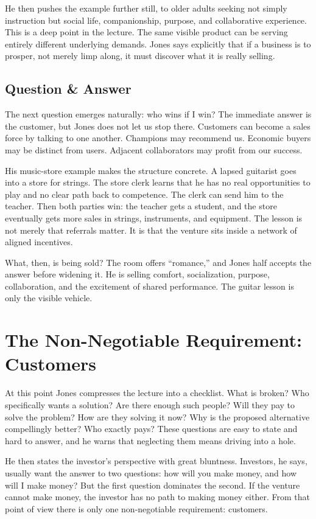 He then pushes the example further still, to older adults seeking not simply instruction but social life, companionship, purpose, and collaborative experience. This is a deep point in the lecture. The same visible product can be serving entirely different underlying demands. Jones says explicitly that if a business is to prosper, not merely limp along, it must discover what it is really selling.

\subsection{Question \& Answer}

The next question emerges naturally: who wins if I win? The immediate answer is the customer, but Jones does not let us stop there. Customers can become a sales force by talking to one another. Champions may recommend us. Economic buyers may be distinct from users. Adjacent collaborators may profit from our success.

His music-store example makes the structure concrete. A lapsed guitarist goes into a store for strings. The store clerk learns that he has no real opportunities to play and no clear path back to competence. The clerk can send him to the teacher. Then both parties win: the teacher gets a student, and the store eventually gets more sales in strings, instruments, and equipment. The lesson is not merely that referrals matter. It is that the venture sits inside a network of aligned incentives.

What, then, is being sold? The room offers ``romance,'' and Jones half accepts the answer before widening it. He is selling comfort, socialization, purpose, collaboration, and the excitement of shared performance. The guitar lesson is only the visible vehicle.

\section{The Non-Negotiable Requirement: Customers}

At this point Jones compresses the lecture into a checklist. What is broken? Who specifically wants a solution? Are there enough such people? Will they pay to solve the problem? How are they solving it now? Why is the proposed alternative compellingly better? Who exactly pays? These questions are easy to state and hard to answer, and he warns that neglecting them means driving into a hole.

He then states the investor's perspective with great bluntness. Investors, he says, usually want the answer to two questions: how will you make money, and how will I make money? But the first question dominates the second. If the venture cannot make money, the investor has no path to making money either. From that point of view there is only one non-negotiable requirement: customers.

